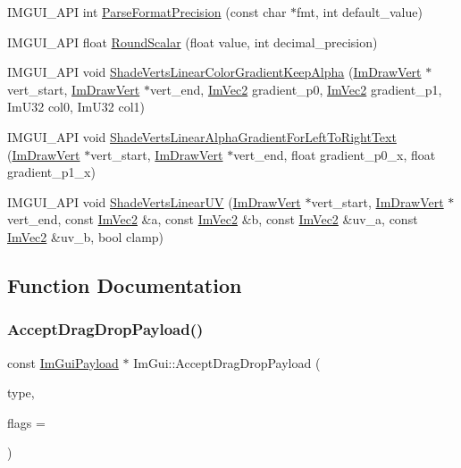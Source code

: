 \begin{DoxyCompactItemize}
\item 
I\+M\+G\+U\+I\+\_\+\+A\+PI int \hyperlink{namespace_im_gui_a40943047a2f8cad978fabffcbd26805f}{Parse\+Format\+Precision} (const char $\ast$fmt, int default\+\_\+value)
\item 
I\+M\+G\+U\+I\+\_\+\+A\+PI float \hyperlink{namespace_im_gui_ab1826c569a8f3296b9723a2148013d28}{Round\+Scalar} (float value, int decimal\+\_\+precision)
\item 
I\+M\+G\+U\+I\+\_\+\+A\+PI void \hyperlink{namespace_im_gui_a7880876c5072e610be8f8e898d2a8866}{Shade\+Verts\+Linear\+Color\+Gradient\+Keep\+Alpha} (\hyperlink{struct_im_draw_vert}{Im\+Draw\+Vert} $\ast$vert\+\_\+start, \hyperlink{struct_im_draw_vert}{Im\+Draw\+Vert} $\ast$vert\+\_\+end, \hyperlink{struct_im_vec2}{Im\+Vec2} gradient\+\_\+p0, \hyperlink{struct_im_vec2}{Im\+Vec2} gradient\+\_\+p1, Im\+U32 col0, Im\+U32 col1)
\item 
I\+M\+G\+U\+I\+\_\+\+A\+PI void \hyperlink{namespace_im_gui_a73b4d230c8fffd2a07d799cd9d4e2a03}{Shade\+Verts\+Linear\+Alpha\+Gradient\+For\+Left\+To\+Right\+Text} (\hyperlink{struct_im_draw_vert}{Im\+Draw\+Vert} $\ast$vert\+\_\+start, \hyperlink{struct_im_draw_vert}{Im\+Draw\+Vert} $\ast$vert\+\_\+end, float gradient\+\_\+p0\+\_\+x, float gradient\+\_\+p1\+\_\+x)
\item 
I\+M\+G\+U\+I\+\_\+\+A\+PI void \hyperlink{namespace_im_gui_a861eab6fa8c850f2e439bf221e91461b}{Shade\+Verts\+Linear\+UV} (\hyperlink{struct_im_draw_vert}{Im\+Draw\+Vert} $\ast$vert\+\_\+start, \hyperlink{struct_im_draw_vert}{Im\+Draw\+Vert} $\ast$vert\+\_\+end, const \hyperlink{struct_im_vec2}{Im\+Vec2} \&a, const \hyperlink{struct_im_vec2}{Im\+Vec2} \&b, const \hyperlink{struct_im_vec2}{Im\+Vec2} \&uv\+\_\+a, const \hyperlink{struct_im_vec2}{Im\+Vec2} \&uv\+\_\+b, bool clamp)
\end{DoxyCompactItemize}


\subsection{Function Documentation}
\hypertarget{namespace_im_gui_a5e0dac39e249bf50e2ae96dc4a97cb18}{}\label{namespace_im_gui_a5e0dac39e249bf50e2ae96dc4a97cb18} 
\subsubsection{\texorpdfstring{Accept\+Drag\+Drop\+Payload()}{AcceptDragDropPayload()}}
{\footnotesize\ttfamily const \hyperlink{struct_im_gui_payload}{Im\+Gui\+Payload} $\ast$ Im\+Gui\+::\+Accept\+Drag\+Drop\+Payload (\begin{DoxyParamCaption}\item[{const char $\ast$}]{type,  }\item[{Im\+Gui\+Drag\+Drop\+Flags}]{flags = {} }\end{DoxyParamCaption})}

